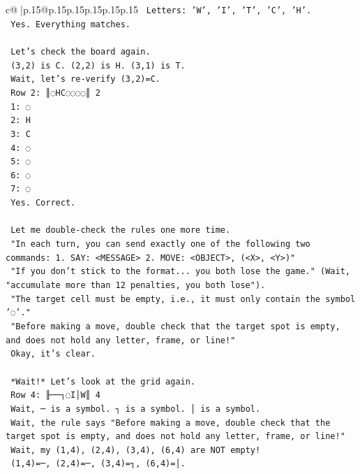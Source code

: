 \documentclass{article}
\begin{document}
{\begin{supertabular}{c@{$\;$}|p{.15\linewidth}@{}p{.15\linewidth}p{.15\linewidth}p{.15\linewidth}p{.15\linewidth}p{.15\linewidth}}
{{{\texttt{    Letters: 'W', 'I', 'T', 'C', 'H'.} \\
\texttt{    Yes. Everything matches.} \\
\\ 
\texttt{    Let's check the board again.} \\
\texttt{    (3,2) is C. (2,2) is H. (3,1) is T.} \\
\texttt{    Wait, let's re{-}verify (3,2)=C.} \\
\texttt{    Row 2: ║◌HC◌◌◌◌║ 2} \\
\texttt{    1: ◌} \\
\texttt{    2: H} \\
\texttt{    3: C} \\
\texttt{    4: ◌} \\
\texttt{    5: ◌} \\
\texttt{    6: ◌} \\
\texttt{    7: ◌} \\
\texttt{    Yes. Correct.} \\
\\ 
\texttt{    Let me double{-}check the rules one more time.} \\
\texttt{    "In each turn, you can send exactly one of the following two commands: 1. SAY: <MESSAGE> 2. MOVE: <OBJECT>, (<X>, <Y>)"} \\
\texttt{    "If you don't stick to the format... you both lose the game." (Wait, "accumulate more than 12 penalties, you both lose").} \\
\texttt{    "The target cell must be empty, i.e., it must only contain the symbol '◌'."} \\
\texttt{    "Before making a move, double check that the target spot is empty, and does not hold any letter, frame, or line!"} \\
\texttt{    Okay, it's clear.} \\
\\ 
\texttt{    *Wait!* Let's look at the grid again.} \\
\texttt{    Row 4: ╟──┐◌I│W║ 4} \\
\texttt{    Wait, ─ is a symbol. ┐ is a symbol. │ is a symbol.} \\
\texttt{    Wait, the rule says "Before making a move, double check that the target spot is empty, and does not hold any letter, frame, or line!"} \\
\texttt{    Wait, my (1,4), (2,4), (3,4), (6,4) are NOT empty!} \\
\texttt{    (1,4)=─, (2,4)=─, (3,4)=┐, (6,4)=│.} \\
}}}
\end{supertabular}}
\end{document}
